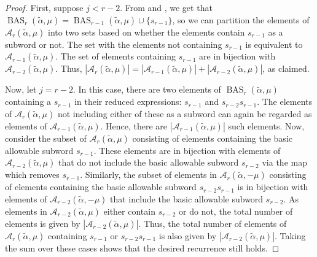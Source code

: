 \documentclass{amsart}
\theoremstyle{definition}
\DeclareMathOperator{\BAS}{BAS}
\newcommand{\hroot}{\tilde{\alpha}}
\newcommand{\calA}{\mathcal{A}}
\begin{document}
\begin{proof}
First, suppose $j < r-2$. From  and , we get that $\BAS_r(\hroot,\mu) = \BAS_{r-1}(\hroot,\mu) \cup \{s_{r-1}\}$, so we can partition the elements of $\mathcal{A}_r(\hroot,\mu)$ into two sets based on whether the elements contain $s_{r-1}$ as a subword or not. 
The set with the elements not containing $s_{r-1}$ is equivalent to $\mathcal{A}_{r-1}(\hroot,\mu)$. The set of elements containing $s_{r-1}$ are in bijection with $\mathcal{A}_{r-2}(\hroot,\mu)$. 
Thus, $|\calA_r(\hroot,\mu)|=|\calA_{r-1}(\hroot,\mu)|+|\calA_{r-2}(\hroot,\mu)|$, as claimed.  

Now, let $j = r-2$. In this case, there are two elements of $\BAS_r(\hroot,\mu)$ containing a $s_{r-1}$ in their reduced expressions: $s_{r-1}$ and $s_{r-2}s_{r-1}$. 
The elements of $\mathcal{A}_r(\hroot,\mu)$ not including either of these as a subword can again be regarded as elements of $\mathcal{A}_{r-1}(\hroot,\mu)$.
Hence, there are $|\mathcal{A}_{r-1}(\hroot,\mu)|$ such elements. 
Now, consider the subset of $\mathcal{A}_r(\hroot,\mu)$ consisting of elements containing the basic allowable subword $s_{r-1}$. 
These elements are in bijection with elements of $\mathcal{A}_{r-2}(\hroot,\mu)$ that do not include the basic allowable subword $s_{r-2}$ via the map which removes $s_{r-1}$.
Similarly, the subset of elements in $\mathcal{A}_r(\hroot,-\mu)$ consisting of elements containing the basic allowable subword $s_{r-2}s_{r-1}$ is in bijection with elements of $\mathcal{A}_{r-2}(\hroot,-\mu)$ that include the basic allowable subword $s_{r-2}$. 
As elements in $\calA_{r-2}(\hroot,\mu)$ either contain $s_{r-2}$ or do not, the total number of elements is given by $|\calA_{r-2}(\hroot,\mu)|$. Thus, the total number of elements of $\calA_r(
\hroot,\mu
)$ containing $s_{r-1}$ or $s_{r-2}s_{r-1}$ is also given by $|\calA_{r-2}(\hroot,\mu)|$.
Taking the sum over these cases shows that the desired recurrence still holds.
\end{proof}
\end{document}
